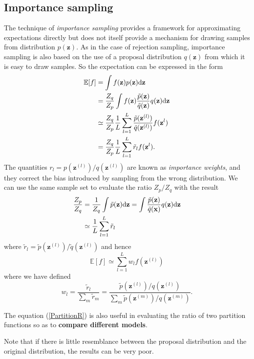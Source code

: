 \documentclass[a4paper]{book}
\newcommand{\ud}{\mathrm{d}}
\renewcommand{\bf}{\mathbf}
\newcommand{\bb}{\mathbb}
\newcommand{\imp}[1]{\textit{#1}}
\begin{document}
\subsection{Importance sampling}
The technique of \imp{importance sampling} provides a framework for approximating expectations directly but does not itself provide a mechanism for drawing samples from distribution $p(\bf{z})$. As in the case of rejection sampling, importance sampling is also based on the use of a proposal distribution $q(\bf{z})$ from which it is easy to draw samples. So the expectation can be expressed in the form
\begin{align}
	\bb{E}[f] &= \int f(\bf{z})p(\bf{z}) \ud \bf{z} \notag \\
	&= \frac{Z_q}{Z_p} \int f(\bf{z})\frac{\tilde{p}(\bf{z})}{\tilde{q}(\bf{z})}q(\bf{z}) \ud \bf{z} \notag \\
	&\simeq \frac{Z_q}{Z_p}\frac{1}{L} \sum_{l=1}^{L} \frac{\tilde{p}(\bf{z}^{(l)})}{\tilde{q}(\bf{z}^{(l)})} f(\bf{z}^{l}) \\
	&= \frac{Z_q}{Z_p}\frac{1}{L} \sum_{l=1}^{L} \tilde{r}_l f(\bf{z}^{l}).
\end{align}
The quantities $r_l = p(\bf{z}^{(l)})/q(\bf{z}^{(l)})$ are known as \imp{importance weights}, and they correct the bias introduced by sampling from the wrong distribution. We can use the same sample set to evaluate the ratio $Z_p/Z_q$ with the result
\begin{align}
	\frac{Z_p}{Z_q} &= \frac{1}{Z_q}\int \tilde{p}(\bf{z}) \ud \bf{z} = \int \frac{\tilde{p}(\bf{z})}{\tilde{q}(\bf{x})} q(\bf{z})\ud \bf{z} \notag \\
	&\simeq \frac{1}{L} \sum_{l=1}^{L} \tilde{r}_l	\label{PartitionR}
\end{align}
where $\tilde{r}_l =  \tilde{p}(\bf{z}^{(l)})/\tilde{q}(\bf{z}^{(l)})$ and hence
\begin{equation}
\boxed{	\bb{E}[f] \simeq \sum_{l=1}^L w_l f(\bf{z}^{(l)})}
\end{equation}
where we have defined
\begin{equation}
	w_l = \frac{\tilde{r}_l}{\sum_m \tilde{r}_m} = \frac{\tilde{p}(\bf{z}^{(l)})/q(\bf{z}^{(l)})}{\sum_m \tilde{p}(\bf{z}^{(m)})/q(\bf{z}^{(m)})}. \label{importance}
\end{equation}

The equation (\ref{PartitionR}) is also useful in evaluating the ratio of two partition functions so as to \textbf{compare different models}.

Note that if there is little resemblance between the proposal distribution and the original distribution, the results can be very poor.
\end{document}
